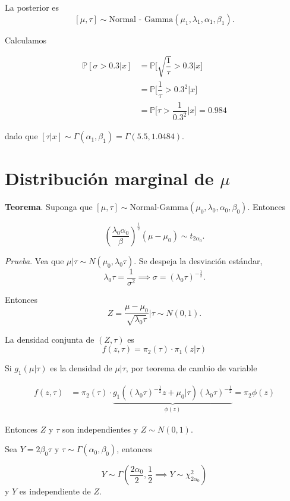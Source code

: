 \documentclass[
  12pt,
]{book}
\begin{document}
La posterior es \[[\mu, \tau]\sim \text{Normal - Gamma}(\mu_1,\lambda_1,\alpha_1,\beta_1).\]

Calculamos

\begin{align*}
\mathbb P[\sigma>0.3|x] & = \mathbb P\bigg[\sqrt{\dfrac 1\tau} >0.3\bigg|x\bigg]\\
& = \mathbb P\bigg[\dfrac 1\tau >0.3^2\bigg|x\bigg]\\ 
& = \mathbb P\bigg[\tau >\dfrac 1{0.3^2}\bigg|x\bigg] = 0.984
\end{align*}

dado que \([\tau|x] \sim \Gamma(\alpha_1,\beta_1) = \Gamma(5.5,1.0484)\).

\hypertarget{distribuciuxf3n-marginal-de-mu}{%
\section{\texorpdfstring{Distribución marginal de \(\mu\)}{Distribución marginal de \textbackslash mu}}\label{distribuciuxf3n-marginal-de-mu}}

\textbf{Teorema}. Suponga que \([\mu,\tau]\sim \text{Normal-Gamma}(\mu_0,\lambda_0,\alpha_0,\beta_0)\). Entonces

\[\left(\dfrac{\lambda_0\alpha_0}{\beta}\right)^{\frac 12}(\mu-\mu_0)\sim t_{2\alpha_0}.\]

\emph{Prueba}. Vea que \(\mu|\tau \sim N(\mu_0,\lambda_0\tau)\). Se despeja la desviación estándar,
\[\lambda_0\tau = \dfrac 1{\sigma^2} \implies \sigma = (\lambda_0\tau)^{-\frac 12}.\]

Entonces
\[Z = \dfrac{\mu-\mu_0}{\sqrt{\lambda_0\tau}}\Bigg|\tau \sim N(0,1).\]

La densidad conjunta de \((Z,\tau)\) es
\[f(z,\tau) = \pi_2(\tau)\cdot\pi_1(z|\tau)\]

Si \(g_1(\mu|\tau)\) es la densidad de \(\mu|\tau\), por teorema de cambio de variable

\begin{align*}
f(z,\tau) & = \pi_2(\tau)\cdot \underbrace{g_1((\lambda_0\tau)^{-\frac 12}z+\mu_0|\tau)(\lambda_0\tau)^{-\frac 12}}_{\phi(z)}
= \pi_2\phi(z)
 \end{align*}

Entonces \(Z\) y \(\tau\) son independientes y \(Z\sim N(0,1)\).

Sea \(Y = 2\beta_0\tau\) y \(\tau\sim \Gamma(\alpha_0,\beta_0)\), entonces

\[Y\sim \Gamma\left(\dfrac{2\alpha_0}{2},\dfrac12 \implies Y\sim \chi^2_{2\alpha_0}\right)\]
y \(Y\) es independiente de \(Z\).
\end{document}
